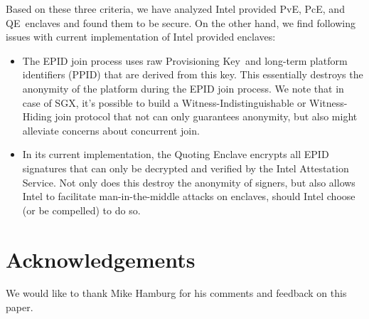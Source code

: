 \documentclass[letterpaper]{article}
\newcommand{\pve}{\textsf{PvE}}
\newcommand{\pce}{\textsf{PcE}}
\newcommand{\qe}{\textsf{QE}}
\newcommand{\pk}{\textsf{Provisioning Key}}
\begin{document}
  Based on these three criteria, we have analyzed Intel provided \pve,
  \pce, and \qe\ enclaves and found them to be secure. On the other
  hand, we find following issues with current implementation of Intel
  provided enclaves:

  \begin{itemize}
    \item The EPID join process uses raw \pk\ and long-term platform
      identifiers (PPID) that are derived from this key. This
      essentially destroys the anonymity of the platform during the
      EPID join process. We note that in case of SGX, it's possible to
      build a Witness-Indistinguishable or Witness-Hiding join
      protocol that not can only guarantees anonymity, but also might
      alleviate concerns about concurrent join.

    \item In its current implementation, the Quoting Enclave encrypts
      all EPID signatures that can only be decrypted and verified by
      the Intel Attestation Service. Not only does this destroy the
      anonymity of signers, but also allows Intel to facilitate
      man-in-the-middle attacks on enclaves, should Intel choose (or
      be compelled) to do so.
  \end{itemize}

\section{Acknowledgements}
\label{sec:ack}
  We would like to thank Mike Hamburg for his comments and feedback on
  this paper.
 
\end{document}
